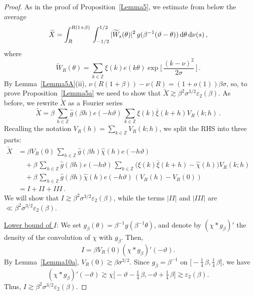 \documentclass[11pt]{amsart}
\numberwithin{equation}{section}
\def\ep{{\varepsilon}}
\newcommand{\bZ}{\mathbb Z}
\begin{document}
\begin{proof}
As in the proof of Proposition~\ref{Lemma5}, we estimate from below the average
\[
\widetilde{X} =
\int_R^{R(1+\beta)}\, \int_{-1/2}^{1/2} |\widetilde{W}_s(\theta)|^2\,
g(\beta^{-1}(\vartheta-\theta))\, {\rm d}\theta\, {\rm d}\nu (s)\,,
\]
where
\[
\widetilde{W}_R(\theta) = \sum_{k\in\bZ} \xi(k)e(k\theta)
\exp\bigl[\,\frac{(k-\nu)^2}{2\sigma} \,\bigr]\,.
\]
By Lemma~\ref{Lemma5A}(ii), $\nu(R(1+\beta))-\nu(R) = (1+o(1))\beta\sigma$, so, to prove Proposition~\ref{Lemma5a} we need to show that
$\widetilde{X} \gtrsim \beta^2\sigma^{3/2}\ep_2(\beta)$.
As before, we rewrite $\widetilde X$ as a Fourier series
\[
\widetilde{X}
= \beta\,
\sum_{h\in\bZ} \widehat{g}(\beta h) e(-h\vartheta)\,
\sum_{k\in\bZ} \xi(k)\bar\xi(k+h) V_R(k; h)\,.
\]
Recalling the notation
$\displaystyle V_R(h) = \sum_{k\in\bZ} V_R(k; h)$, we split the RHS into three parts:
\begin{align*}
\widetilde{X}  &= \beta V_R(0)\, \sum_{h\in\bZ} \widehat{g}(\beta h)\widehat{\chi}(h) e(-h\vartheta) \\
&\quad + \beta\, \sum_{h\in\bZ} \widehat{g}(\beta h) e(-h\vartheta)\,
\sum_{k\in\bZ} \bigl( \xi(k)\bar\xi(k+h) - \widehat{\chi}(h) \bigr) V_R(k; h) \\
&\quad + \beta\, \sum_{h\in\bZ} \widehat{g}(\beta h) \widehat{\chi}(h) e(-h\vartheta)\,
(V_R(h) - V_R(0)) \\
&= I +II + III\,.
\end{align*}
We will show that $I\gtrsim \beta^2\sigma^{3/2}\ep_2(\beta)$, while
the terms $|II|$ and $|III|$ are  $\ll \beta^2\sigma^{3/2}\ep_2(\beta)$.

\medskip\noindent\underline{Lower bound of $I$}:
We set $g_\beta(\theta) = \beta^{-1}g(\beta^{-1}\theta)$, and denote by
$(\chi * g_\beta)'$ the density of the convolution of $\chi$ with
$g_\beta$. Then, \[ I=\beta V_R(0) (\chi * g_\beta)'(-\vartheta).\]
By Lemma~\ref{Lemma10a}, $V_R(0)\gtrsim \beta \sigma^{3/2}$. Since $g_\beta = \beta^{-1}$ on
$ \bigl[-\tfrac14\, \beta, \tfrac14\, \beta \bigr]$, we have
\[
(\chi * g_\beta)'(-\vartheta) \gtrsim
\chi\bigl[-\vartheta-\tfrac14\, \beta, -\vartheta + \tfrac14\, \beta \bigr]
\gtrsim \ep_2(\beta).
\]
Thus, $I \gtrsim \beta^2 \sigma^{3/2} \ep_2(\beta)$.


\end{proof}
\end{document}
